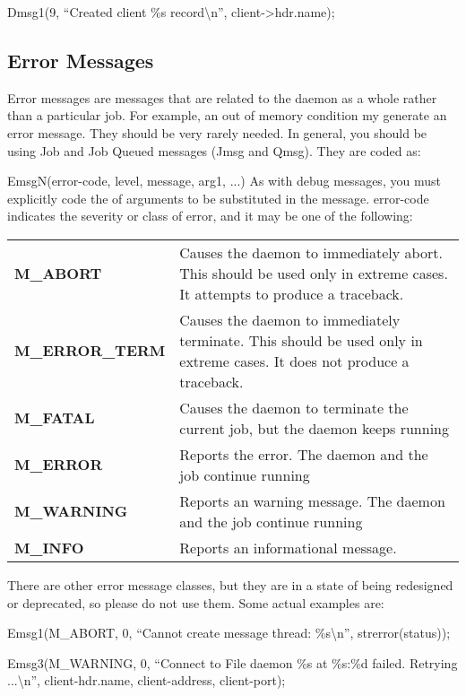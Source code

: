 Dmsg1(9, ``Created client \%s record\textbackslash{}n'', client->hdr.name); 

\subsection{Error Messages}

Error messages are messages that are related to the daemon as a whole rather
than a particular job. For example, an out of memory condition my generate an
error message. They should be very rarely needed. In general, you should be
using Job and Job Queued messages (Jmsg and Qmsg). They are coded as: 

EmsgN(error-code, level, message, arg1, ...) As with debug messages, you must
explicitly code the of arguments to be substituted in the message. error-code
indicates the severity or class of error, and it may be one of the following: 

\begin{longtable}{lp{3in}}
{{\bf M\_ABORT} } & {Causes the daemon to immediately abort. This should be
used only  in extreme cases. It attempts to produce a  traceback. } \\
{{\bf M\_ERROR\_TERM} } & {Causes the daemon to immediately terminate. This
should be used only  in extreme cases. It does not produce a  traceback. } \\
{{\bf M\_FATAL} } & {Causes the daemon to terminate the current job, but the
daemon keeps running } \\
{{\bf M\_ERROR} } & {Reports the error. The daemon and the job continue
running } \\
{{\bf M\_WARNING} } & {Reports an warning message. The daemon and the job
continue running } \\
{{\bf M\_INFO} } & {Reports an informational message.}

\end{longtable}

There are other error message classes, but they are in a state of being
redesigned or deprecated, so please do not use them. Some actual examples are:


Emsg1(M\_ABORT, 0, ``Cannot create message thread: \%s\textbackslash{}n'',
strerror(status)); 

Emsg3(M\_WARNING, 0, ``Connect to File daemon \%s at \%s:\%d failed. Retrying
...\textbackslash{}n'',  client-\gt{}hdr.name, client-\gt{}address,
client-\gt{}port); 

